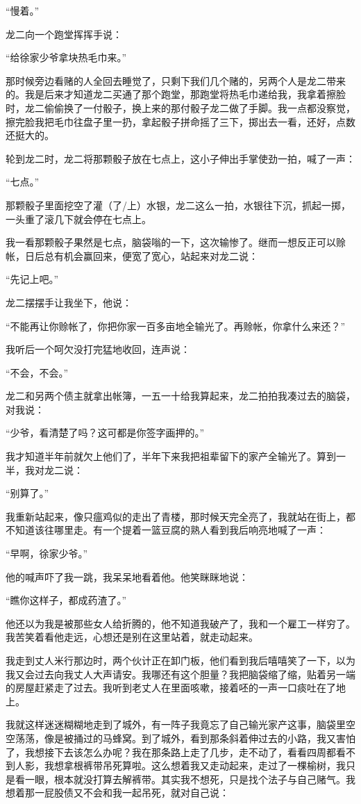 \documentclass[12pt,UTF8]{ctexbook}
\begin{document}
“慢着。”

龙二向一个跑堂挥挥手说：

“给徐家少爷拿块热毛巾来。”

那时候旁边看赌的人全回去睡觉了，只剩下我们几个赌的，另两个人是龙二带来的。我是后来才知道龙二买通了那个跑堂，那跑堂将热毛巾递给我，我拿着擦脸时，龙二偷偷换了一付骰子，换上来的那付骰子龙二做了手脚。我一点都没察觉，擦完脸我把毛巾往盘子里一扔，拿起骰子拼命摇了三下，掷出去一看，还好，点数还挺大的。

轮到龙二时，龙二将那颗骰子放在七点上，这小子伸出手掌使劲一拍，喊了一声：

“七点。”

那颗骰子里面挖空了灌（了/上）水银，龙二这么一拍，水银往下沉，抓起一掷，一头重了滚几下就会停在七点上。

我一看那颗骰子果然是七点，脑袋嗡的一下，这次输惨了。继而一想反正可以赊帐，日后总有机会赢回来，便宽了宽心，站起来对龙二说：

“先记上吧。”

龙二摆摆手让我坐下，他说：

“不能再让你赊帐了，你把你家一百多亩地全输光了。再赊帐，你拿什么来还？”

我听后一个呵欠没打完猛地收回，连声说：

“不会，不会。”

龙二和另两个债主就拿出帐簿，一五一十给我算起来，龙二拍拍我凑过去的脑袋，对我说：

“少爷，看清楚了吗？这可都是你签字画押的。”

我才知道半年前就欠上他们了，半年下来我把祖辈留下的家产全输光了。算到一半，我对龙二说：

“别算了。”

我重新站起来，像只瘟鸡似的走出了青楼，那时候天完全亮了，我就站在街上，都不知道该往哪里走。有一个提着一篮豆腐的熟人看到我后响亮地喊了一声：

“早啊，徐家少爷。”

他的喊声吓了我一跳，我呆呆地看着他。他笑眯眯地说：

“瞧你这样子，都成药渣了。”

他还以为我是被那些女人给折腾的，他不知道我破产了，我和一个雇工一样穷了。我苦笑着看他走远，心想还是别在这里站着，就走动起来。

我走到丈人米行那边时，两个伙计正在卸门板，他们看到我后嘻嘻笑了一下，以为我又会过去向我丈人大声请安。我哪还有这个胆量？我把脑袋缩了缩，贴着另一端的房屋赶紧走了过去。我听到老丈人在里面咳嗽，接着呸的一声一口痰吐在了地上。

我就这样迷迷糊糊地走到了城外，有一阵子我竟忘了自己输光家产这事，脑袋里空空荡荡，像是被捅过的马蜂窝。到了城外，看到那条斜着伸过去的小路，我又害怕了，我想接下去该怎么办呢？我在那条路上走了几步，走不动了，看看四周都看不到人影，我想拿根裤带吊死算啦。这么想着我又走动起来，走过了一棵榆树，我只是看一眼，根本就没打算去解裤带。其实我不想死，只是找个法子与自己赌气。我想着那一屁股债又不会和我一起吊死，就对自己说：
\end{document}
